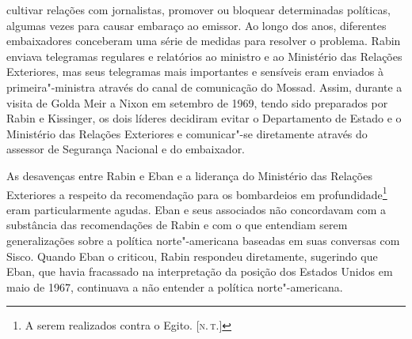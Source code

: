 {cultivar relações com jornalistas, promover ou bloquear determinadas
políticas, algumas vezes para causar embaraço ao emissor. Ao longo dos
anos, diferentes embaixadores conceberam uma série de medidas para
resolver o problema. Rabin enviava telegramas regulares e relatórios ao
ministro e ao Ministério das Relações Exteriores, mas seus telegramas
mais importantes e sensíveis eram enviados à primeira"-ministra através
do canal de comunicação do Mossad. Assim, durante a visita de Golda Meir
a Nixon em setembro de 1969, tendo sido preparados por Rabin e
Kissinger, os dois líderes decidiram evitar o Departamento de Estado e o
Ministério das Relações Exteriores e comunicar"-se diretamente através do
assessor de Segurança Nacional e do embaixador.}

As desavenças entre Rabin e Eban e a liderança do Ministério das Relações
Exteriores a respeito da recomendação para os bombardeios em
profundidade\footnote{A serem realizados contra o Egito. [\textsc{n.\,t.}]} eram particularmente agudas. Eban e seus associados não concordavam com a substância das recomendações de
Rabin e com o que entendiam serem generalizações sobre a política
norte"-americana baseadas em suas conversas com Sisco. Quando Eban o
criticou, Rabin respondeu diretamente, sugerindo que Eban, que havia
fracassado na interpretação da posição dos Estados Unidos em maio de 1967,
continuava a não entender a política norte"-americana.


